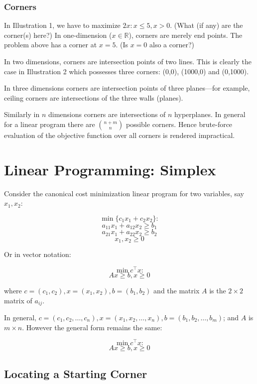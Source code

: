 \documentclass[11pt,]{article}
\begin{document}
\subsubsection{Corners}\label{corners}

In Illustration 1, we have to maximize \(2x: x\leq 5, x>0\). (What (if
any) are the corner(s) here?) In one-dimension (\(x\in \mathbb{R}\)),
corners are merely end points. The problem above has a corner at
\(x=5\). (Is \(x=0\) also a corner?)

In two dimensions, corners are intersection points of two lines. This is
clearly the case in Illustration 2 which possesses three corners: (0,0),
(1000,0) and (0,1000).

In three dimensions corners are intersection points of three
planes---for example, ceiling corners are intersections of the three
walls (planes).

Similarly in \(n\) dimensions corners are intersections of \(n\)
hyperplanes. In general for a linear program there are \(n+m\choose n\)
possible corners. Hence brute-force evaluation of the objective function
over all corners is rendered impractical.

\section{Linear Programming: Simplex}\label{linear-programming-simplex}

Consider the canonical cost minimization linear program for two
variables, say \(x_1, x_2\):

\[
\min\{c_1x_1+c_2x_2\}: 
\] \[
a_{11}x_1+a_{12}x_2 \geq b_1
\] \[
a_{21}x_1+a_{22}x_2 \geq b_2
\] \[
x_1, x_2 \geq 0
\]

Or in vector notation:

\[
\min c^{\top}x:
\] \[
Ax\geq b, x\geq 0
\]

where \(c = (c_1, c_2), x =(x_1, x_2), b = (b_1, b_2)\) and the matrix
\(A\) is the \(2\times 2\) matrix of \(a_{ij}\).

In general,
\(c = (c_1, c_2, \hdots, c_n), x =(x_1, x_2, \hdots, x_n), b = (b_1, b_2, \hdots, b_m)\);
and \(A\) is \(m\times n\). However the general form remains the same:

\[
\min c^{\top}x:
\] \[
Ax\geq b, x\geq 0
\]

\subsection{Locating a Starting
Corner}\label{locating-a-starting-corner}
\end{document}
